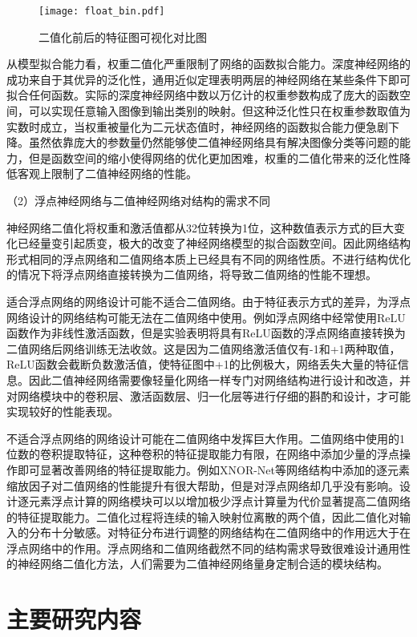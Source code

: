 \begin{figure}[htb]
  \centering
  \texttt{[image: float\_bin.pdf]}
  \caption{二值化前后的特征图可视化对比图}
  \label{fig:float_bin}
\end{figure}

从模型拟合能力看，权重二值化严重限制了网络的函数拟合能力。深度神经网络的成功来自于其优异的泛化性，通用近似定理\citep{ua}表明两层的神经网络在某些条件下即可拟合任何函数。实际的深度神经网络中数以万亿计的权重参数构成了庞大的函数空间，可以实现任意输入图像到输出类别的映射。但这种泛化性只在权重参数取值为实数时成立，当权重被量化为二元状态值时，神经网络的函数拟合能力便急剧下降。虽然依靠庞大的参数量仍然能够使二值神经网络具有解决图像分类等问题的能力，但是函数空间的缩小使得网络的优化更加困难，权重的二值化带来的泛化性降低客观上限制了二值神经网络的性能。

（2）浮点神经网络与二值神经网络对结构的需求不同

神经网络二值化将权重和激活值都从32位转换为1位，这种数值表示方式的巨大变化已经量变引起质变，极大的改变了神经网络模型的拟合函数空间。因此网络结构形式相同的浮点网络和二值网络本质上已经具有不同的网络性质。不进行结构优化的情况下将浮点网络直接转换为二值网络，将导致二值网络的性能不理想。

适合浮点网络的网络设计可能不适合二值网络。由于特征表示方式的差异，为浮点网络设计的网络结构可能无法在二值网络中使用。例如浮点网络中经常使用ReLU函数作为非线性激活函数，但是实验表明将具有ReLU函数的浮点网络直接转换为二值网络后网络训练无法收敛。这是因为二值网络激活值仅有-1和+1两种取值，ReLU函数会截断负数激活值，使特征图中+1的比例极大，网络丢失大量的特征信息。因此二值神经网络需要像轻量化网络一样专门对网络结构进行设计和改造，并对网络模块中的卷积层、激活函数层、归一化层等进行仔细的斟酌和设计，才可能实现较好的性能表现。

不适合浮点网络的网络设计可能在二值网络中发挥巨大作用。二值网络中使用的1位数的卷积提取特征，这种卷积的特征提取能力有限，在网络中添加少量的浮点操作即可显著改善网络的特征提取能力。例如XNOR-Net\cite{xnornet}等网络结构中添加的逐元素缩放因子对二值网络的性能提升有很大帮助，但是对浮点网络却几乎没有影响。设计逐元素浮点计算的网络模块可以以增加极少浮点计算量为代价显著提高二值网络的特征提取能力。二值化过程将连续的输入映射位离散的两个值，因此二值化对输入的分布十分敏感。对特征分布进行调整的网络结构在二值网络中的作用远大于在浮点网络中的作用。浮点网络和二值网络截然不同的结构需求导致很难设计通用性的神经网络二值化方法，人们需要为二值神经网络量身定制合适的模块结构。

\section{主要研究内容}

